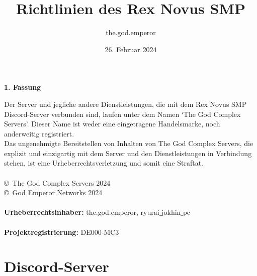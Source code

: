 \documentclass{article}
\title{Richtlinien des Rex Novus SMP}
\author{the.god.emperor}
\date{26. Februar 2024}
\begin{document}
\maketitle

\newpage
{}
\vspace*{\fill}
\begin{Center}
\textbf{1. Fassung}
\vspace*{\fill}
\end{Center}
\newpage
Der Server und jegliche andere Dienstleistungen, die mit dem Rex Novus SMP Discord-Server verbunden sind,
laufen unter dem Namen `The God Complex Servers'. Dieser Name ist weder eine eingetragene Handelsmarke, noch
anderweitig registriert.\\
Das ungenehmigte Bereitstellen von Inhalten von The God Complex Servers, die explizit und einzigartig mit dem Server und
den Dienstleistungen in Verbindung stehen, ist eine Urheberrechtsverletzung und somit eine Straftat.
\\\\
\copyright\ The God Complex Servers 2024\\
\copyright\ God Emperor Networks 2024
\\\\
\textbf{Urheberrechtsinhaber: } 
the.god.emperor, $\text{ryurai\_jokhin\_pc}$
\\\\
\textbf{Projektregistrierung: }
DE000-MC3
\newpage
\tableofcontents
\newpage
\section{Discord-Server}
\end{document}

